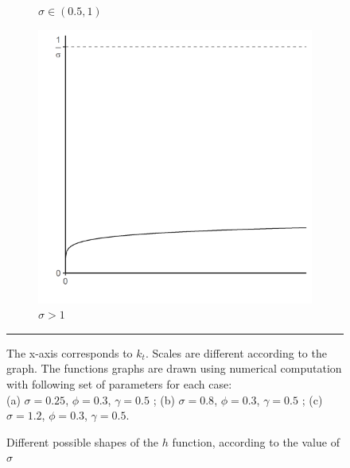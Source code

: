 \begin{figure}[tb]
\begin{subfigure}[t]{0.32\linewidth}
			\caption{$\sigma \in \left(0.5, 1\right)$} 
			\label{fig:h_shape_2} 
		\end{subfigure}
		\begin{subfigure}[t]{0.32\linewidth}
			\centering
			\includegraphics[width=1\linewidth]{../result/appendix_A/function_h/graph_3.png} 
			\caption{$\sigma > 1$} 
			\label{fig:h_shape_3} 
		\end{subfigure} 
		\caption{Different possible shapes of the $h$ function, according to the value of $\sigma$}
		\label{fig:h_shape}
		\vspace{.5ex}
		\hrule
		\vspace{-4ex}
		\justify\singlespacing\footnotesize The x-axis corresponds to $k_t$. Scales are different according to the graph. The functions graphs are drawn using numerical computation with following set of parameters for each case:\\
		(a) $\sigma = 0.25$, $\phi = 0.3$, $\gamma = 0.5$ ; \hspace{4ex}(b) $\sigma = 0.8$, $\phi = 0.3$, $\gamma = 0.5$ ; \hspace{4ex}(c) $\sigma = 1.2$, $\phi = 0.3$, $\gamma = 0.5$.
	\end{figure}


